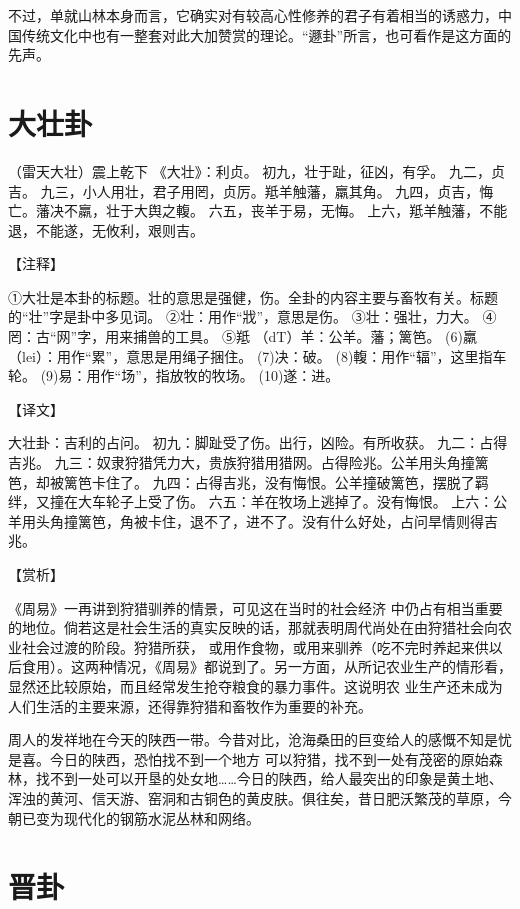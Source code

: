 \documentclass[12pt,UTF8]{ctexbook}
\begin{document}
不过，单就山林本身而言，它确实对有较高心性修养的君子有着相当的诱惑力，中国传统文化中也有一整套对此大加赞赏的理论。“遯卦”所言，也可看作是这方面的先声。

\chapter{大壮卦}

（雷天大壮）震上乾下
《大壮》：利贞。
初九，壮于趾，征凶，有孚。
九二，贞吉。
九三，小人用壮，君子用罔，贞厉。羝羊触藩，羸其角。
九四，贞吉，悔亡。藩决不羸，壮于大舆之輹。
六五，丧羊于易，无悔。
上六，羝羊触藩，不能退，不能遂，无攸利，艰则吉。

【注释】

①大壮是本卦的标题。壮的意思是强健，伤。全卦的内容主要与畜牧有关。标题的“壮”字是卦中多见词。
②壮：用作“戕”，意思是伤。
③壮：强壮，力大。
④罔：古“网”字，用来捕兽的工具。
⑤羝 （dT）羊：公羊。藩；篱笆。
(6)羸（lei）：用作“累”，意思是用绳子捆住。
(7)决：破。
(8)輹：用作“辐”，这里指车轮。
(9)易：用作“场”，指放牧的牧场。
(10)遂：进。

【译文】

大壮卦：吉利的占问。
初九：脚趾受了伤。出行，凶险。有所收获。
九二：占得吉兆。
九三：奴隶狩猎凭力大，贵族狩猎用猎网。占得险兆。公羊用头角撞篱笆，却被篱笆卡住了。
九四：占得吉兆，没有悔恨。公羊撞破篱笆，摆脱了羁绊，又撞在大车轮子上受了伤。
六五：羊在牧场上逃掉了。没有悔恨。
上六：公羊用头角撞篱笆，角被卡住，退不了，进不了。没有什么好处，占问旱情则得吉兆。

【赏析】

《周易》一再讲到狩猎驯养的情景，可见这在当时的社会经济 中仍占有相当重要的地位。倘若这是社会生活的真实反映的话，那就表明周代尚处在由狩猎社会向农业社会过渡的阶段。狩猎所获， 或用作食物，或用来驯养（吃不完时养起来供以后食用）。这两种情况，《周易》都说到了。另一方面，从所记农业生产的情形看，显然还比较原始，而且经常发生抢夺粮食的暴力事件。这说明农 业生产还未成为人们生活的主要来源，还得靠狩猎和畜牧作为重要的补充。

周人的发祥地在今天的陕西一带。今昔对比，沧海桑田的巨变给人的感慨不知是忧是喜。今日的陕西，恐怕找不到一个地方 可以狩猎，找不到一处有茂密的原始森林，找不到一处可以开垦的处女地……今日的陕西，给人最突出的印象是黄土地、浑浊的黄河、信天游、窑洞和古铜色的黄皮肤。俱往矣，昔日肥沃繁茂的草原，今朝已变为现代化的钢筋水泥丛林和网络。

\chapter{晋卦}
\end{document}
